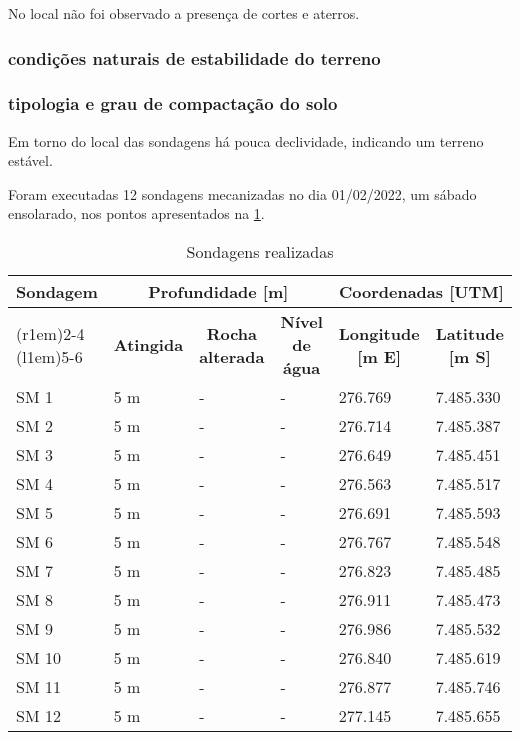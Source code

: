 No local não foi observado a presença de cortes e aterros.

\subsubsection{condições naturais de estabilidade do terreno}

\subsubsection{tipologia e grau de compactação do solo}

Em torno do local das sondagens há pouca declividade,
indicando um terreno estável.

Foram executadas 12 sondagens mecanizadas no dia
01/02/2022, um sábado ensolarado, nos pontos
apresentados na \cref{tab:sondspec}.

\begin{table}[htb!]
	\renewcommand{\multirowsetup}{\centering}
	\renewcommand\tabularxcolumn[1]{m{#1}}
	\centering
	\caption{Sondagens realizadas}
	\label{tab:sondspec}
	\begin{tabularx}{\textwidth}{l X X X X X}
		\toprule
		\multirow{3}{*}{\textbf{Sondagem}} & 
		\multicolumn{3}{c}{\textbf{Profundidade [m]}} &
		\multicolumn{2}{c}{\textbf{Coordenadas [UTM]}}\\
		\cmidrule(r{1em}){2-4}
		\cmidrule(l{1em}){5-6}
		&
		\multicolumn{1}{c}{\textbf{Atingida}} &
		\multicolumn{1}{c}{\textbf{Rocha alterada}} &
		\multicolumn{1}{c}{\textbf{Nível de água}} &
		\multicolumn{1}{c}{\textbf{Longitude [m E]}} &
		\multicolumn{1}{c}{\textbf{Latitude [m S]}} \\
		\midrule
SM  1 & 5 m & - & - & 276.769 & 7.485.330\\
SM  2 & 5 m & - & - & 276.714 & 7.485.387\\
SM  3 & 5 m & - & - & 276.649 & 7.485.451\\
SM  4 & 5 m & - & - & 276.563 & 7.485.517\\
SM  5 & 5 m & - & - & 276.691 & 7.485.593\\
SM  6 & 5 m & - & - & 276.767 & 7.485.548\\
SM  7 & 5 m & - & - & 276.823 & 7.485.485\\
SM  8 & 5 m & - & - & 276.911 & 7.485.473\\
SM  9 & 5 m & - & - & 276.986 & 7.485.532\\
SM 10 & 5 m & - & - & 276.840 & 7.485.619\\
SM 11 & 5 m & - & - & 276.877 & 7.485.746\\
SM 12 & 5 m & - & - & 277.145 & 7.485.655\\
		\bottomrule		
	\end{tabularx}
\end{table}

\FloatBarrier

